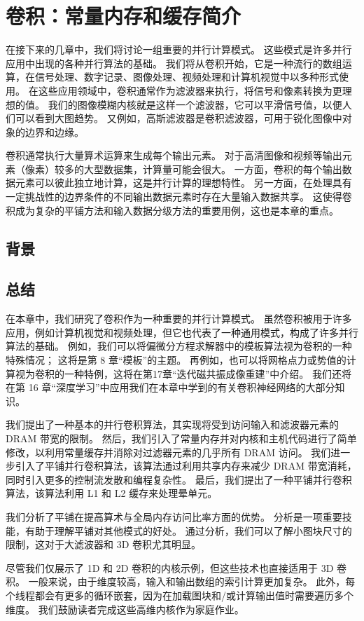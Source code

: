 \section{卷积：常量内存和缓存简介}
在接下来的几章中，我们将讨论一组重要的并行计算模式。 这些模式是许多并行应用中出现的各种并行算法的基础。 我们将从卷积开始，它是一种流行的数组运算，在信号处理、数字记录、图像处理、视频处理和计算机视觉中以多种形式使用。 在这些应用领域中，卷积通常作为滤波器来执行，将信号和像素转换为更理想的值。 我们的图像模糊内核就是这样一个滤波器，它可以平滑信号值，以便人们可以看到大图趋势。 又例如，高斯滤波器是卷积滤波器，可用于锐化图像中对象的边界和边缘。

卷积通常执行大量算术运算来生成每个输出元素。 对于高清图像和视频等输出元素（像素）较多的大型数据集，计算量可能会很大。 一方面，卷积的每个输出数据元素可以彼此独立地计算，这是并行计算的理想特性。 另一方面，在处理具有一定挑战性的边界条件的不同输出数据元素时存在大量输入数据共享。 这使得卷积成为复杂的平铺方法和输入数据分级方法的重要用例，这也是本章的重点。

\subsection{背景}

\subsection{总结}
在本章中，我们研究了卷积作为一种重要的并行计算模式。 虽然卷积被用于许多应用，例如计算机视觉和视频处理，但它也代表了一种通用模式，构成了许多并行算法的基础。 例如，我们可以将偏微分方程求解器中的模板算法视为卷积的一种特殊情况； 这将是第 8 章“模板”的主题。 再例如，也可以将网格点力或势值的计算视为卷积的一种特例，这将在第17章“迭代磁共振成像重建”中介绍。 我们还将在第 16 章“深度学习”中应用我们在本章中学到的有关卷积神经网络的大部分知识。

我们提出了一种基本的并行卷积算法，其实现将受到访问输入和滤波器元素的 DRAM 带宽的限制。 然后，我们引入了常量内存并对内核和主机代码进行了简单修改，以利用常量缓存并消除对过滤器元素的几乎所有 DRAM 访问。 我们进一步引入了平铺并行卷积算法，该算法通过利用共享内存来减少 DRAM 带宽消耗，同时引入更多的控制流发散和编程复杂性。 最后，我们提出了一种平铺并行卷积算法，该算法利用 L1 和 L2 缓存来处理晕单元。

我们分析了平铺在提高算术与全局内存访问比率方面的优势。 分析是一项重要技能，有助于理解平铺对其他模式的好处。 通过分析，我们可以了解小图块尺寸的限制，这对于大滤波器和 3D 卷积尤其明显。

尽管我们仅展示了 1D 和 2D 卷积的内核示例，但这些技术也直接适用于 3D 卷积。 一般来说，由于维度较高，输入和输出数组的索引计算更加复杂。 此外，每个线程都会有更多的循环嵌套，因为在加载图块和/或计算输出值时需要遍历多个维度。 我们鼓励读者完成这些高维内核作为家庭作业。